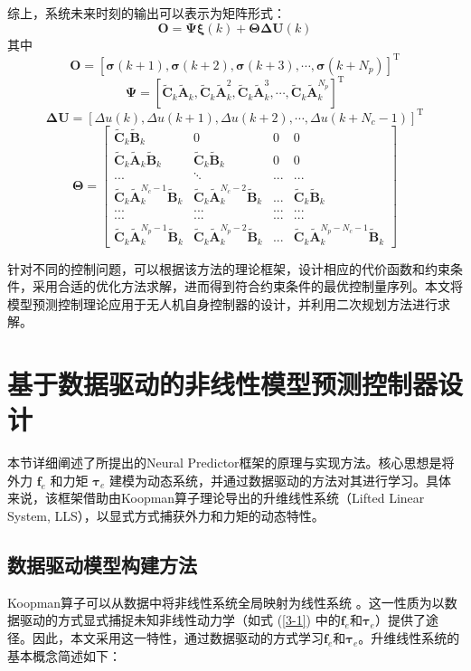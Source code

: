 \documentclass[lang=chs, degree=master, blindreview=true, winfonts=true]{yanputhesis}
\begin{document}
综上，系统未来时刻的输出可以表示为矩阵形式：
\begin{equation}
    \bm O = \bm \Psi \bm \xi(k) + \bm \Theta \bm \Delta \bm U(k)
\end{equation}
其中$$
\boldsymbol{O} = 
\left[
	\boldsymbol{\sigma}(k+1) , \boldsymbol{\sigma}(k+2) , \boldsymbol{\sigma}(k+3) , \cdots , \boldsymbol{\sigma}(k+N_p)
\right]^\mathrm{T}$$
$$\boldsymbol{\Psi} = 
\left[
	\boldsymbol{\tilde{C}}_k\boldsymbol{\tilde{A}}_k , \boldsymbol{\tilde{C}}_k\boldsymbol{\tilde{A}}_k^2 , \boldsymbol{\tilde{C}}_k\boldsymbol{\tilde{A}}_k^3 , \cdots , \boldsymbol{\tilde{C}}_k\boldsymbol{\tilde{A}}_k^{N_p}
\right]^\mathrm{T}$$
$$\boldsymbol{\Delta U} = 
\left[
	\Delta u(k) , \Delta u(k+1) , \Delta u(k+2) , \cdots , \Delta u(k+N_c-1)
\right]^\mathrm{T}$$
$$\bm \Theta=\begin{bmatrix}\tilde{\bm C}_k\tilde{\bm B}_k&0&0&0\\\tilde{\bm C}_k\tilde{\bm A}_k\tilde{\bm B}_k&\tilde{\bm C}_k\tilde{\bm B}_k&0&0\\...&\ddots&...&...\\\tilde{\bm C}_k\tilde{\bm A}_k^{N_c-1}\tilde{\bm B}_k&\tilde{\bm C}_k\tilde{\bm A}_k^{N_c-2}\tilde{\bm B}_k&...&\tilde{\bm C}_k\tilde{\bm B}_k\\...&...&...&...\\...&...&...&...\\\tilde{\bm C}_k\tilde{\bm A}_k^{N_p-1}\tilde{\bm B}_k&\tilde{\bm C}_k\tilde{\bm A}_k^{N_p-2}\tilde{\bm B}_k&...&\tilde{\bm C}_k\tilde{\bm A}_k^{N_p-N_c-1}\tilde{\bm B}_k\end{bmatrix}$$

针对不同的控制问题，可以根据该方法的理论框架，设计相应的代价函数和约束条件，采用合适的优化方法求解，进而得到符合约束条件的最优控制量序列。本文将模型预测控制理论应用于无人机自身控制器的设计，并利用二次规划方法进行求解。

\section{基于数据驱动的非线性模型预测控制器设计}
本节详细阐述了所提出的Neural Predictor框架的原理与实现方法。核心思想是将外力 $\bm{f}_e$ 和力矩 $\bm{\tau}_e$ 建模为动态系统，并通过数据驱动的方法对其进行学习。具体来说，该框架借助由Koopman算子理论导出的升维线性系统（Lifted Linear System, LLS），以显式方式捕获外力和力矩的动态特性。

\subsection{数据驱动模型构建方法}
Koopman算子可以从数据中将非线性系统全局映射为线性系统 \cite{Mamakoukas2023}。这一性质为以数据驱动的方式显式捕捉未知非线性动力学（如式 (\ref{3-1}) 中的$\bm f_e$和$\bm \tau_e$）提供了途径。因此，本文采用这一特性，通过数据驱动的方式学习$\bm f_e$和$\bm \tau_e$。升维线性系统的基本概念简述如下：
\end{document}
